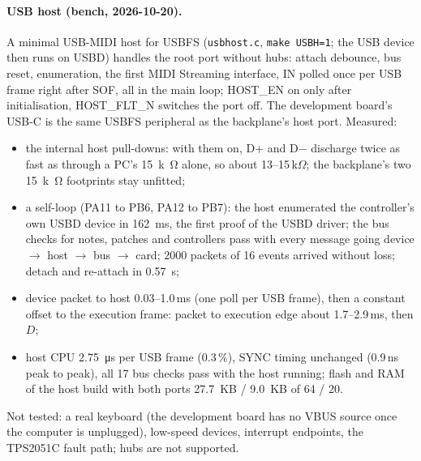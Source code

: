 \documentclass[11pt,a4paper]{article}
\newcommand{\file}[1]{\texttt{#1}}
\begin{document}
\paragraph{USB host (bench, 2026-10-20).} A minimal USB-MIDI host for USBFS (\file{usbhost.c}, \texttt{make USBH=1};
the USB device then runs on USBD) handles the root port without hubs: attach debounce, bus reset, enumeration, the
first MIDI Streaming interface, IN polled once per USB frame right after SOF, all in the main loop; HOST\_EN on only
after initialisation, HOST\_FLT\_N switches the port off. The development board's USB-C is the same USBFS
peripheral as the backplane's host port. Measured:
\begin{itemize}
  \item the internal host pull-downs: with them on, D+ and D$-$ discharge twice as fast as through a PC's
    \SI{15}{k\ohm} alone, so about 13--15\,k$\Omega$; the backplane's two \SI{15}{k\ohm} footprints stay unfitted;
  \item a self-loop (PA11 to PB6, PA12 to PB7): the host enumerated the controller's own USBD device in
    \SI{162}{ms}, the first proof of the USBD driver; the bus checks for notes, patches and controllers pass with
    every message going device $\to$ host $\to$ bus $\to$ card; 2000 packets of 16 events arrived without loss;
    detach and re-attach in \SI{0.57}{s};
  \item device packet to host 0.03--1.0\,ms (one poll per USB frame), then a constant offset to the execution frame:
    packet to execution edge about 1.7--2.9\,ms, then $D$;
  \item host CPU \SI{2.75}{\micro s} per USB frame (0.3\,\%), SYNC timing unchanged (0.9\,ns peak to peak), all 17 bus
    checks pass with the host running; flash and RAM of the host build with both ports \SI{27.7}{KB} /
    \SI{9.0}{KB} of 64 / 20.
\end{itemize}
Not tested: a real keyboard (the development board has no VBUS source once the computer is unplugged), low-speed
devices, interrupt endpoints, the TPS2051C fault path; hubs are not supported.
\end{document}
